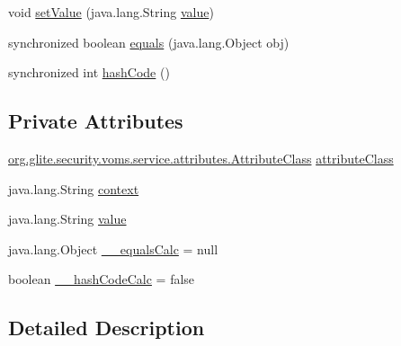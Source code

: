 \begin{DoxyCompactItemize}
\item 
void \hyperlink{classorg_1_1glite_1_1security_1_1voms_1_1service_1_1attributes_1_1AttributeValue_ab5e9f4411b420dc6c8041bf4a0d45067}{setValue} (java.lang.String \hyperlink{classorg_1_1glite_1_1security_1_1voms_1_1service_1_1attributes_1_1AttributeValue_aa1f50539b35f3efd45c50ca8165f52d8}{value})
\item 
synchronized boolean \hyperlink{classorg_1_1glite_1_1security_1_1voms_1_1service_1_1attributes_1_1AttributeValue_a1f9ea73b48fb45e648749aaca3bed059}{equals} (java.lang.Object obj)
\item 
synchronized int \hyperlink{classorg_1_1glite_1_1security_1_1voms_1_1service_1_1attributes_1_1AttributeValue_ad456b6d90c4ade061e035f75e5c4f661}{hashCode} ()
\end{DoxyCompactItemize}
\subsection*{Private Attributes}
\begin{DoxyCompactItemize}
\item 
\hyperlink{classorg_1_1glite_1_1security_1_1voms_1_1service_1_1attributes_1_1AttributeClass}{org.glite.security.voms.service.attributes.AttributeClass} \hyperlink{classorg_1_1glite_1_1security_1_1voms_1_1service_1_1attributes_1_1AttributeValue_a1cbf215d1cf7105a3680f39d81a8a6c5}{attributeClass}
\item 
java.lang.String \hyperlink{classorg_1_1glite_1_1security_1_1voms_1_1service_1_1attributes_1_1AttributeValue_acfb2dbac22d0f61179a66e37178845fd}{context}
\item 
java.lang.String \hyperlink{classorg_1_1glite_1_1security_1_1voms_1_1service_1_1attributes_1_1AttributeValue_aa1f50539b35f3efd45c50ca8165f52d8}{value}
\item 
java.lang.Object \hyperlink{classorg_1_1glite_1_1security_1_1voms_1_1service_1_1attributes_1_1AttributeValue_acd87aec60573e754e6fccb6490b6e70a}{\_\-\_\-equalsCalc} = null
\item 
boolean \hyperlink{classorg_1_1glite_1_1security_1_1voms_1_1service_1_1attributes_1_1AttributeValue_a6c0c0a14443e29ef8d0994afc223e593}{\_\-\_\-hashCodeCalc} = false
\end{DoxyCompactItemize}


\subsection{Detailed Description}


